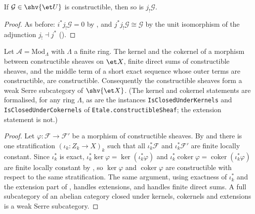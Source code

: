 \begin{lemma}
\label{lemma:constructible-lowerShriek-open}
\leanok
If $\mathcal G\in\shv{\et U}$ is constructible, then so is
$j_!\mathcal G$.
\end{lemma}
\begin{proof}
\leanok
As before: $i^*j_!\mathcal G=0$ by
, and $j^*j_!\mathcal G\cong
\mathcal G$ by the unit isomorphism of the adjunction $j_!\dashv j^*$
().
\end{proof}

\begin{theorem}
\label{thm:constructible-serre}
Let $\mathcal A=\mathrm{Mod}_\Lambda$ with $\Lambda$ a finite ring.  The
kernel and the cokernel of a morphism between constructible sheaves on
$\et X$, finite direct sums of constructible sheaves, and the middle term of
a short exact sequence whose outer terms are constructible, are
constructible.  Consequently the constructible sheaves form a weak Serre
subcategory of $\shv{\et X}$.  (The kernel and cokernel statements are
formalised, for any ring $\Lambda$, as are the instances
\texttt{IsClosedUnderKernels} and \texttt{IsClosedUnderCokernels} of
\texttt{Etale.constructibleSheaf}; the extension statement is not.)
\end{theorem}
\begin{proof}
Let $\varphi\colon\mathcal F\to\mathcal F'$ be a morphism of constructible
sheaves.  By  and
 there is one stratification
$(\iota_k\colon Z_k\to X)_k$ such that all $\iota_k^*\mathcal F$ and
$\iota_k^*\mathcal F'$ are finite locally constant.  Since $\iota_k^*$ is
exact, $\iota_k^*\ker\varphi=\ker(\iota_k^*\varphi)$ and
$\iota_k^*\operatorname{coker}\varphi=\operatorname{coker}(\iota_k^*\varphi)$
are finite locally constant by , so
$\ker\varphi$ and $\operatorname{coker}\varphi$ are constructible with
respect to the same stratification.  The same argument, using exactness of
$\iota_k^*$ and the extension part of ,
handles extensions, and  handles
finite direct sums.  A full subcategory of an abelian category closed under
kernels, cokernels and extensions is a weak Serre subcategory.
\end{proof}

